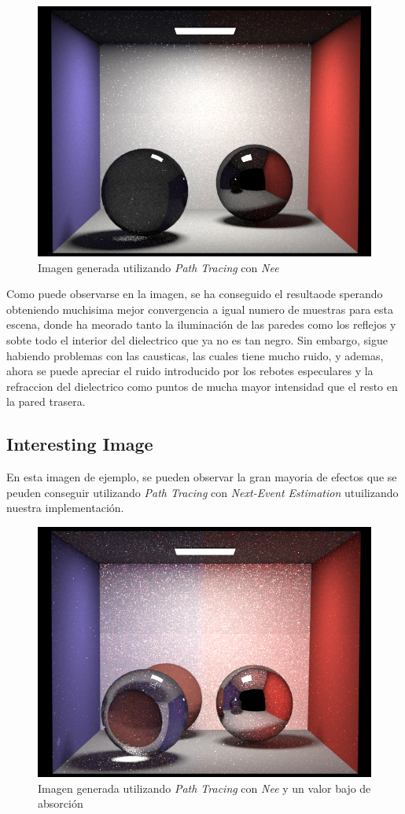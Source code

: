 \documentclass[10pt,oneside,a4paper]{article}
\begin{document}
\begin{figure}[h]
\centering
\includegraphics[width=.6\linewidth]{images/cbox_pathNee_512.png}
\caption{Imagen generada utilizando \textit{Path Tracing} con \textit{Nee}}
\label{fig:disp}
\end{figure}

Como puede observarse en la imagen, se ha conseguido el resultaode sperando obteniendo muchisima mejor convergencia a igual numero de muestras para esta escena, donde ha meorado tanto la iluminación de las paredes como los reflejos y sobte todo el interior del dielectrico que ya no es tan negro. Sin embargo, sigue habiendo problemas con las causticas, las cuales tiene mucho ruido, y ademas, ahora se puede apreciar el ruido introducido por los rebotes especulares y la refraccion del dielectrico como puntos de mucha mayor intensidad que el resto en la pared trasera.
 
 \subsection{Interesting Image}
En esta imagen de ejemplo, se pueden observar la gran mayoria de efectos que se peuden conseguir utilizando \textit{ Path Tracing} con \textit{Next-Event Estimation} utuilizando nuestra implementación.

\begin{figure}[h]
\centering
\includegraphics[width=.6\linewidth]{images/cbox_interesting_nee_512.png}
\caption{Imagen generada utilizando \textit{Path Tracing} con \textit{Nee} y un valor bajo de absorción}
\label{fig:disp}
\end{figure}
\end{document}
